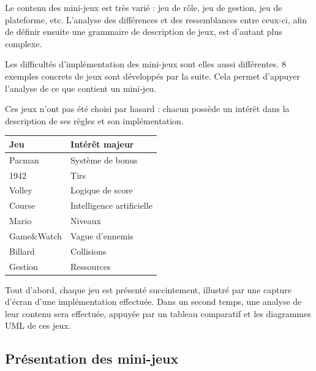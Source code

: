 
Le contenu des mini-jeux est très varié : jeu de rôle, jeu de gestion, jeu de plateforme, etc.
L'analyse des différences et des ressemblances entre ceux-ci, afin de définir ensuite une grammaire de description de jeux, est d'autant plus complexe.

Les difficultés d'implémentation des mini-jeux sont elles aussi différentes.
8 exemples concrets de jeux sont développés par la suite.
Cela permet d'appuyer l'analyse de ce que contient un mini-jeu.

Ces jeux n'ont pas été choisi par hasard : chacun possède un intérêt dans la description de ses règles et son implémentation. 


\vspace{0.5cm}

\begin{tabular}{l|l}
 Jeu & Intérêt majeur \\
 \hline
 Pacman & Système de bonus \\
 1942 & Tirs \\
 Volley & Logique de score \\
 Course & Intelligence artificielle \\
 Mario & Niveaux \\
 Game\&Watch & Vague d'ennemis \\
 Billard & Collisions \\
 Gestion & Ressources \\
\end{tabular}

\vspace{0.5cm}

Tout d'abord, chaque jeu est présenté succintement, illustré par une capture d'écran d'une implémentation effectuée.
Dans un second temps, une analyse de leur contenu sera effectuée, appuyée par un tableau comparatif et les diagrammes UML de ces jeux.

\clearpage

\subsection{Présentation des mini-jeux}


